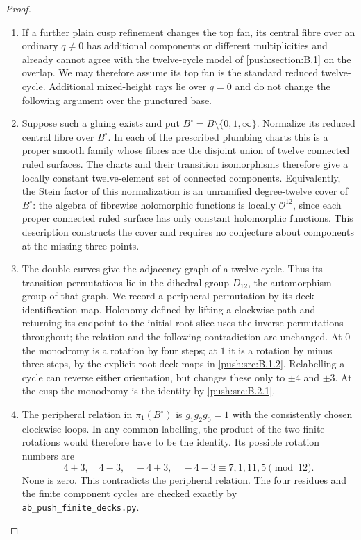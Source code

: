 \begin{proof}
\begin{enumerate}[label=\arabic*.,leftmargin=*]
\item If a further plain cusp refinement changes the top fan,
its central fibre over an ordinary $q\ne0$ has additional
components or different multiplicities and already cannot
agree with the twelve-cycle model of \ref{push:section:B.1} on the overlap.
We may therefore assume its top fan is the standard reduced
twelve-cycle. Additional mixed-height rays lie over $q=0$
and do not change the following argument over the punctured
base.

\item Suppose such a gluing exists and put
$B^\circ=B\setminus\{0,1,\infty\}$. Normalize
its reduced central fibre over $B^\circ$. In
each of the prescribed plumbing charts this is
a proper smooth family whose fibres are the
disjoint union of twelve connected ruled
surfaces. The charts and their transition
isomorphisms therefore give a locally constant
twelve-element set of connected components.
Equivalently, the Stein factor of this
normalization is an unramified degree-twelve
cover of $B^\circ$: the algebra of fibrewise
holomorphic functions is locally $\mathcal O^{12}$,
since each proper connected ruled surface has
only constant holomorphic functions. This
description constructs the cover and requires
no conjecture about components at the missing
three points.

\item The double curves give the adjacency graph of
a twelve-cycle. Thus its transition
permutations lie in the dihedral group
$D_{12}$, the automorphism group of that graph.
We record a peripheral permutation by its
deck-identification map. Holonomy defined by
lifting a clockwise path and returning its
endpoint to the initial root slice uses the
inverse permutations throughout; the relation
and the following contradiction are unchanged.
At $0$ the monodromy is a rotation by four
steps; at $1$ it is a rotation by minus three
steps, by the explicit root deck maps in
\ref{push:src:B.1.2}. Relabelling a cycle can reverse either
orientation, but changes these only to
$\pm4$ and $\pm3$. At the cusp the
monodromy is the identity by \ref{push:src:B.2.1}.

\item The peripheral relation in
$\pi_1(B^\circ)$ is $g_1g_2g_0=1$ with
the consistently chosen clockwise loops.
In any common labelling, the product of the
two finite rotations would therefore have
to be the identity. Its possible rotation
numbers are
\[
 4+3,\quad4-3,\quad-4+3,\quad-4-3
 \equiv7,1,11,5\pmod {12}.
\]
None is zero. This contradicts the peripheral
relation. The four residues and the finite
component cycles are checked exactly by
\texttt{ab\_push\_finite\_decks.py}.
\end{enumerate}
\end{proof}

